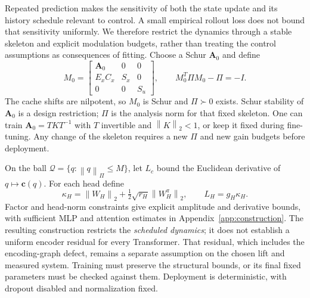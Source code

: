 \documentclass[journal]{IEEEtran}
\newcommand{\vc}{\mathbf{c}}
\newcommand{\mA}{\mathbf{A}}
\newcommand{\norm}[1]{\left\lVert #1\right\rVert}
\begin{document}
Repeated prediction makes the sensitivity of both the state update and its history schedule relevant to control. A small empirical rollout loss does not bound that sensitivity uniformly. We therefore restrict the dynamics through a stable skeleton and explicit modulation budgets, rather than treating the control assumptions as consequences of fitting. Choose a Schur $\mA_0$ and define
\begin{equation}
M_0=\begin{bmatrix}\mA_0&0&0\\E_xC_x&S_x&0\\0&0&S_u\end{bmatrix},\qquad
M_0^T\Pi M_0-\Pi=-I.
\label{eq:lyapunov_skeleton}
\end{equation}
The cache shifts are nilpotent, so $M_0$ is Schur and $\Pi\succ0$ exists. Schur stability of $\mA_0$ is a design restriction; $\Pi$ is the analysis norm for that fixed skeleton. One can train $\mA_0=TKT^{-1}$ with $T$ invertible and $\norm{K}_2<1$, or keep it fixed during fine-tuning. Any change of the skeleton requires a new $\Pi$ and new gain budgets before deployment.

On the ball $\mathcal Q=\{q:\norm{q}_\Pi\le M\}$, let $L_c$ bound the Euclidean derivative of $q\mapsto\vc(q)$. For each head define
\begin{equation}
\kappa_H=\norm{W_H}_2+\tfrac12\sqrt{r_H}\norm{W_H^\pi}_2,\qquad L_H=g_H\kappa_H.
\label{eq:Lipschitz_constants}
\end{equation}
Factor and head-norm constraints give explicit amplitude and derivative bounds, with sufficient MLP and attention estimates in Appendix~\ref{app:construction}. The resulting construction restricts the \emph{scheduled dynamics}; it does not establish a uniform encoder residual for every Transformer. That residual, which includes the encoding-graph defect, remains a separate assumption on the chosen lift and measured system. Training must preserve the structural bounds, or its final fixed parameters must be checked against them. Deployment is deterministic, with dropout disabled and normalization fixed.
\end{document}

